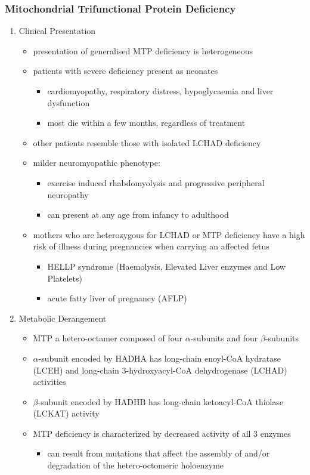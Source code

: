 \documentclass[12pt]{scrartcl}
\begin{document}
\subsubsection{Mitochondrial Trifunctional Protein Deficiency}
\label{sec:org28221e0}
\begin{enumerate}
\item Clinical Presentation
\label{sec:orgfc1a3e0}
\begin{itemize}
\item presentation of generalised MTP deficiency is heterogeneous
\item patients with severe deficiency present as neonates
\begin{itemize}
\item cardiomyopathy, respiratory distress, hypoglycaemia and liver dysfunction
\item most die within a few months, regardless of treatment
\end{itemize}
\item other patients resemble those with isolated LCHAD deficiency
\item milder neuromyopathic phenotype:
\begin{itemize}
\item exercise induced rhabdomyolysis and progressive peripheral
neuropathy
\item can present at any age from infancy to adulthood
\end{itemize}
\item mothers who are heterozygous for LCHAD or MTP deficiency have a high
risk of illness during pregnancies when carrying an affected fetus
\begin{itemize}
\item HELLP syndrome (Haemolysis, Elevated Liver enzymes and Low Platelets)
\item acute fatty liver of pregnancy (AFLP)
\end{itemize}
\end{itemize}
\item Metabolic Derangement
\label{sec:org7f975ec}
\begin{itemize}
\item MTP a hetero-octamer composed of four \(\alpha\)-subunits and four
\(\beta\)-subunits
\item \(\alpha\)-subunit encoded by HADHA has long-chain enoyl-CoA hydratase
(LCEH) and long-chain 3-hydroxyacyl-CoA dehydrogenase (LCHAD)
activities
\item \(\beta\)-subunit encoded by HADHB has long-chain ketoacyl-CoA thiolase
(LCKAT) activity
\item MTP deficiency is characterized by decreased activity of all 3 enzymes
\begin{itemize}
\item can result from mutations that affect the assembly of and/or
degradation of the hetero-octomeric holoenzyme
\end{itemize}
\end{itemize}


\end{enumerate}
\end{document}

